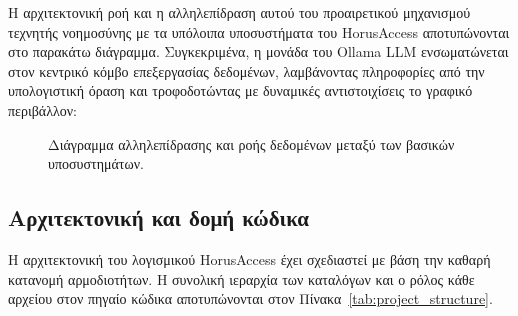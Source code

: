 \documentclass[twoside, a4paper, 11pt]{article}
\newcommand{\textlatin}[1]{\textenglish{#1}}
\begin{document}
Η αρχιτεκτονική ροή και η αλληλεπίδραση αυτού του προαιρετικού μηχανισμού τεχνητής νοημοσύνης με τα υπόλοιπα υποσυστήματα του \textlatin{HorusAccess} αποτυπώνονται στο παρακάτω διάγραμμα. Συγκεκριμένα, η μονάδα του \textlatin{Ollama LLM} ενσωματώνεται στον κεντρικό κόμβο επεξεργασίας δεδομένων, λαμβάνοντας πληροφορίες από την υπολογιστική όραση και τροφοδοτώντας με δυναμικές αντιστοιχίσεις το γραφικό περιβάλλον:

\begin{figure}[htbp]
    \centering
    \caption{Διάγραμμα αλληλεπίδρασης και ροής δεδομένων μεταξύ των βασικών υποσυστημάτων.}
    \label{fig:libs_interaction}
\end{figure}

\clearpage
\subsection{Αρχιτεκτονική και δομή κώδικα }

Η αρχιτεκτονική του λογισμικού \textlatin{HorusAccess} έχει σχεδιαστεί με βάση την καθαρή κατανομή αρμοδιοτήτων. Η συνολική ιεραρχία των καταλόγων και ο ρόλος κάθε αρχείου στον πηγαίο κώδικα αποτυπώνονται στον Πίνακα~\ref{tab:project_structure}.
\end{document}
